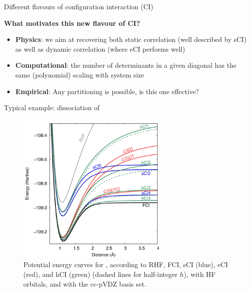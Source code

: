 \documentclass[final]{beamer}
\newlength{\colwidth}
\begin{document}
\begin{frame}[t]
\begin{columns}[t]
\begin{column}{\colwidth}
\begin{block}{Different flavours of configuration interaction (CI)}
\begin{figure}
  \label{fig:table_exc}
\end{figure}
\vspace{-0.5cm}
{\bf What motivates this new flavour of CI?}
\vspace{-0.5cm}
\begin{itemize}
  \item {\bf Physics}: we aim at recovering both static correlation (well described by sCI) as well as dynamic correlation (where eCI performs well)
  \item {\bf Computational}: the number of determinants in a given diagonal has the same (polynomial) scaling with system size
  \item {\bf Empirical}: Any partitioning is possible, is this one effective?
\end{itemize}
\end{block}


\begin{block}{Typical example: dissociation of }
  \vspace{-0.5cm}
  \begin{figure}
    \includegraphics[width=0.67\textwidth]{fig/plot_pes_3.pdf}
    \caption{Potential energy curves for , according to RHF, FCI, sCI (blue), eCI (red), and hCI (green) (dashed lines for half-integer $h$), with HF orbitals, and with the cc-pVDZ basis set.}
    \label{fig:plot_pes_3}
  \end{figure}
\end{block}


\end{column}
\end{columns}
\end{frame}
\end{document}
